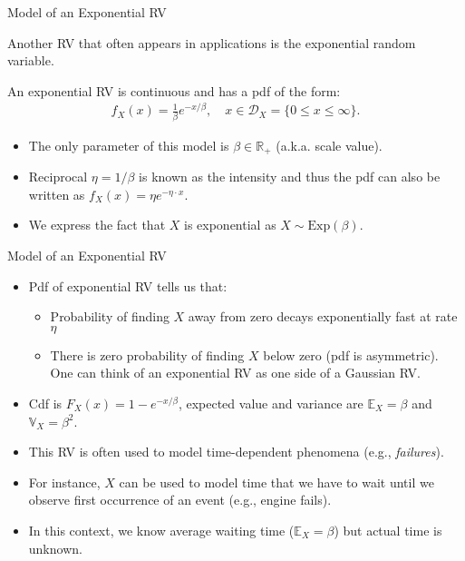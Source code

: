 \documentclass[handout,9pt]{beamer}
\begin{document}
%
\begin{frame}{Model of an Exponential RV}

Another RV that often appears in applications is the exponential random variable.  

\begin{block}{}
An exponential RV is continuous and has a pdf of the form:
\begin{align*}
f_X(x)=\frac{1}{\beta}e^{-x/\beta},\quad x\in \mathcal{D}_X=\{0\leq x\leq \infty\}.
\end{align*}
\end{block}
\begin{itemize}
\setlength{\itemsep}{10pt}
\item The only parameter of this model is $\beta \in \mathbb{R}_+$ (a.k.a. scale value). 
\item Reciprocal $\eta=1/\beta$ is known as the intensity and thus the pdf can also be written as $f_X(x)=\eta e^{-\eta\cdot x}$. 
\item We express the fact that $X$ is exponential as $X\sim \textrm{Exp}(\beta)$.
\end{itemize}

\end{frame}

%
\begin{frame}{Model of an Exponential RV}

\begin{itemize}
\setlength{\itemsep}{10pt}
\item Pdf of exponential RV tells us that:

\begin{itemize} 
\setlength{\itemsep}{10pt}
\item Probability of finding $X$ away from zero decays exponentially fast at rate $\eta$
\item There is zero probability of finding $X$ below zero (pdf is asymmetric). One can think of an exponential RV as one side of a Gaussian RV. 
\end{itemize}
\item Cdf is $F_X(x)=1-e^{-x/\beta}$, expected value and variance are $\mathbb{E}_X=\beta$ and $\mathbb{V}_X=\beta^2$.
\item This RV is often used to model time-dependent phenomena (e.g., {\em failures}). 
\item For instance, $X$ can be used to model time that we have to wait until we observe first occurrence of an event (e.g., engine fails). 
\item In this context, we know average waiting time ($\mathbb{E}_X=\beta$) but actual time is unknown. 
\end{itemize}

\end{frame}
\end{document}
